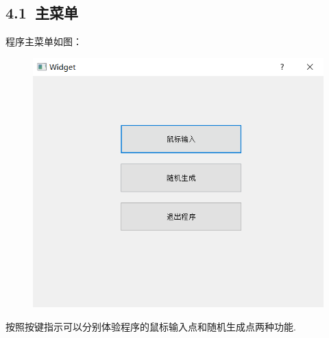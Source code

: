 \documentclass[UTF8]{ctexart}
\begin{document}
\subsection*{4.1\ 主菜单}
程序主菜单如图：
\begin{figure}[H]\begin{center}
	\includegraphics[scale = 0.5]{1.png}
\end{center}\end{figure}\par
按照按键指示可以分别体验程序的鼠标输入点和随机生成点两种功能.
\end{document}
